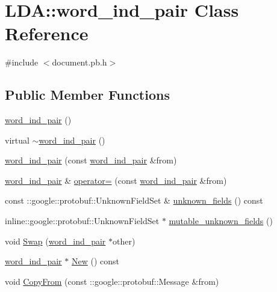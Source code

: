\hypertarget{class_l_d_a_1_1word__ind__pair}{
\section{LDA::word\_\-ind\_\-pair Class Reference}
\label{class_l_d_a_1_1word__ind__pair}
}


{\ttfamily \#include $<$document.pb.h$>$}

\subsection*{Public Member Functions}
\begin{DoxyCompactItemize}
\item 
\hyperlink{class_l_d_a_1_1word__ind__pair_a9b75330b8611487612a6f2a2cd64ef68}{word\_\-ind\_\-pair} ()
\item 
virtual \hyperlink{class_l_d_a_1_1word__ind__pair_a1dd434bc6f11a87160e22ac554ae0a86}{$\sim$word\_\-ind\_\-pair} ()
\item 
\hyperlink{class_l_d_a_1_1word__ind__pair_a6bf43ac2337925978a6525f8a41b519c}{word\_\-ind\_\-pair} (const \hyperlink{class_l_d_a_1_1word__ind__pair}{word\_\-ind\_\-pair} \&from)
\item 
\hyperlink{class_l_d_a_1_1word__ind__pair}{word\_\-ind\_\-pair} \& \hyperlink{class_l_d_a_1_1word__ind__pair_a3a0db936ddaf2105165f00b0594a76e1}{operator=} (const \hyperlink{class_l_d_a_1_1word__ind__pair}{word\_\-ind\_\-pair} \&from)
\item 
const ::google::protobuf::UnknownFieldSet \& \hyperlink{class_l_d_a_1_1word__ind__pair_aac377eba9af306e7c620360821feab15}{unknown\_\-fields} () const 
\item 
inline::google::protobuf::UnknownFieldSet $\ast$ \hyperlink{class_l_d_a_1_1word__ind__pair_ad0e15294e5b2b76ce48db1026ed9b3b3}{mutable\_\-unknown\_\-fields} ()
\item 
void \hyperlink{class_l_d_a_1_1word__ind__pair_a1feb41096844b321e264d3f5eb830699}{Swap} (\hyperlink{class_l_d_a_1_1word__ind__pair}{word\_\-ind\_\-pair} $\ast$other)
\item 
\hyperlink{class_l_d_a_1_1word__ind__pair}{word\_\-ind\_\-pair} $\ast$ \hyperlink{class_l_d_a_1_1word__ind__pair_accd0fc3a7fc345b04d25f4c806985835}{New} () const 
\item 
void \hyperlink{class_l_d_a_1_1word__ind__pair_a39142475defcc6cbc10f317fa658b423}{CopyFrom} (const ::google::protobuf::Message \&from)
\item 

\end{DoxyCompactItemize}
